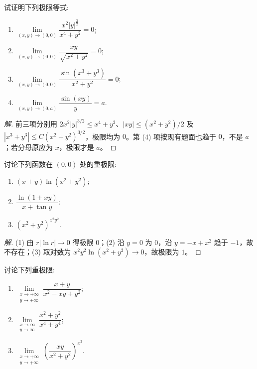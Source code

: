 \documentclass[../../数学分析培优讲义(答案版).tex]{subfiles}
\begin{document}
\begin{example}
试证明下列极限等式:
\begin{enumerate}[label=(\arabic*)]
    \item $\displaystyle\lim\limits_{(x,y)\to(0,0)}\dfrac{x^2|y|^{\frac{3}{2}}}{x^4+y^2}=0$;
    \item $\displaystyle\lim\limits_{(x,y)\to(0,0)}\dfrac{xy}{\sqrt{x^2+y^2}}=0$;
    \item $\displaystyle\lim\limits_{(x,y)\to(0,0)}\dfrac{\sin(x^3+y^3)}{x^2+y^2}=0$;
    \item $\displaystyle\lim\limits_{(x,y)\to(0,a)}\dfrac{\sin(xy)}{y}=a$.
\end{enumerate}
\end{example}

\begin{proof}[解]
前三项分别用 $2x^2|y|^{3/2}\leq x^4+y^2$、$|xy|\leq(x^2+y^2)/2$ 及 $|x^3+y^3|\leq C(x^2+y^2)^{3/2}$，极限均为 $0$。第 (4) 项按现有题面也趋于 $0$，不是 $a$；若分母原应为 $x$，极限才是 $a$。
\end{proof}

\begin{example}
讨论下列函数在 $(0,0)$ 处的重极限:
\begin{enumerate}[label=(\arabic*)]
    \item $(x+y)\ln(x^2+y^2)$;
    \item $\displaystyle\dfrac{\ln(1+xy)}{x+\tan y}$;
    \item $(x^2+y^2)^{x^2y^2}$.
\end{enumerate}
\end{example}

\begin{proof}[解]
(1) 由 $r|\ln r|\to0$ 得极限 $0$；(2) 沿 $y=0$ 为 $0$，沿 $y=-x+x^2$ 趋于 $-1$，故不存在；(3) 取对数为 $x^2y^2\ln(x^2+y^2)\to0$，故极限为 $1$。
\end{proof}

\begin{example}
讨论下列重极限:
\begin{enumerate}[label=(\arabic*)]
    \item $\displaystyle\lim\limits_{\substack{x\to+\infty\\y\to+\infty}}\dfrac{x+y}{x^2-xy+y^2}$;
    \item $\displaystyle\lim\limits_{\substack{x\to\infty\\y\to\infty}}\dfrac{x^2+y^2}{x^4+y^4}$;
    \item $\displaystyle\lim\limits_{\substack{x\to+\infty\\y\to+\infty}}\left(\dfrac{xy}{x^2+y^2}\right)^{x^2}$.
\end{enumerate}
\end{example}
\end{document}
